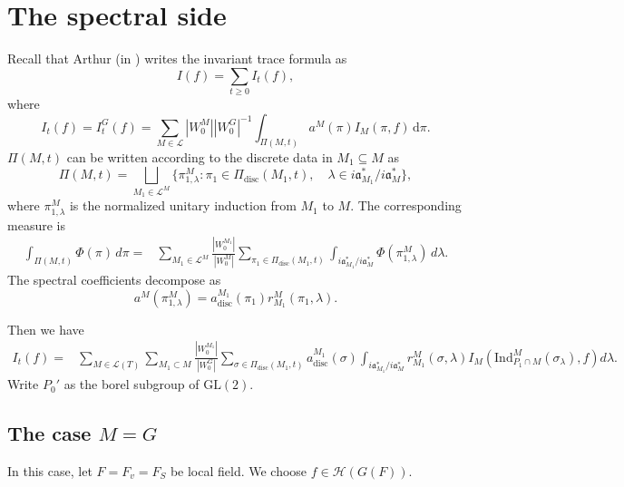 \documentclass[11pt]{amsart}
\newcommand{\GGL}{\mathrm{GL}}
\theoremstyle{definition}
\numberwithin{equation}{section}
\begin{document}
	
	
	
	\section{The spectral side}
	Recall that Arthur (in \cite{Art88(1)}) writes the invariant trace formula as
	\begin{equation*}
		I(f) = \sum_{t \ge 0} I_t(f),
	\end{equation*}
	where
	\begin{equation*}
		I_t(f) = I_t^G(f) = \sum_{M \in \mathcal{L}} |W_0^M| |W_0^G|^{-1} \int_{\Pi(M,t)} a^M(\pi) I_M(\pi, f) \, \mathrm{d}\pi.
	\end{equation*}\(\Pi(M, t)\) can be written according to the discrete data in \(M_1 \subseteq M\) as
	\begin{equation*}
		\Pi(M, t) = \bigsqcup_{M_1 \in \mathcal{L}^M} \{ \pi_{1, \lambda}^M : \pi_1 \in \Pi_{\mathrm{disc}}(M_1, t), \quad \lambda \in i\mathfrak{a}_{M_1}^* / i\mathfrak{a}_M^* \},
	\end{equation*}
	where \(\pi_{1, \lambda}^M\) is the normalized unitary induction from \(M_1\) to \(M\). The corresponding measure is
	\begin{equation*}
		\begin{split}
			\int_{\Pi(M,t)} \Phi(\pi) \, d\pi = & \sum_{M_1 \in \mathcal{L}^M} \frac{|W_0^{M_1}|}{|W_0^M|} \sum_{\pi_1 \in \Pi_{\mathrm{disc}}(M_1, t)}\int_{i\mathfrak{a}_{M_1}^* / i\mathfrak{a}_M^*} \Phi(\pi_{1,\lambda}^M) \, d\lambda.
		\end{split}
	\end{equation*}
	The spectral coefficients decompose as
	\begin{equation*}
		a^M(\pi_{1,\lambda}^M) = a_{\mathrm{disc}}^{M_1}(\pi_1)r_{M_1}^M(\pi_1, \lambda).
	\end{equation*}
	
	Then we have 
	\begin{align}\label{dist}
		I_t(f) = & \sum_{M \in \mathcal{L}(T)} \sum_{M_1 \subset M}\frac{|W_0^{M_1}|}{|W_0^G|} \sum_{\sigma \in \Pi_{\mathrm{disc}}(M_1, t)} a_{\mathrm{disc}}^{M_1}(\sigma)\int_{i\mathfrak{a}_{M_1}^* / i\mathfrak{a}_M^*} r_{M_1}^M(\sigma, \lambda) I_M \left( \mathrm{Ind}_{P_1\cap M}^M(\sigma_\lambda), f \right) d\lambda.
	\end{align}
	Write \(P_0'\) as the borel subgroup of \(\GGL(2)\).
	
	\subsection{The case \(M=G\)}
	In this case, let \(F=F_v=F_S\) be local field. We choose \(f\in\mathcal{H}(G(F))\).
    
\end{document}
